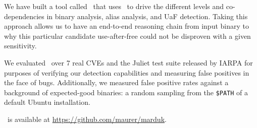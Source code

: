 We have built a tool called \aliasname\ that uses \sysname\ to drive the different levels and co-dependencies in binary analysis, alias analysis, and UaF detection.
Taking this approach allows us to have an end-to-end reasoning chain from input binary to why this particular candidate use-after-free could not be disproven with a given sensitivity.

We evaluated \aliasname\ over 7 real CVEs and the Juliet test suite released by IARPA for purposes of verifying our detection capabilities and measuring false positives in the face of bugs.
Additionally, we measured false positive rates against a background of expected-good binaries: a random sampling from the \texttt{\$PATH} of a default Ubuntu installation.

\aliasname\ is available at \url{https://github.com/maurer/marduk}.
